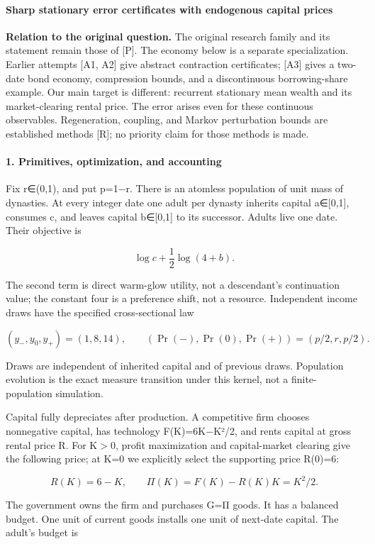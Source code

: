 \documentclass{article}
\begin{document}
\paragraph{Sharp stationary error certificates with endogenous capital prices}

\textbf{Relation to the original question.} The original research family and its statement remain those of [P]. The economy below is a separate specialization. Earlier attempts [A1, A2] give abstract contraction certificates; [A3] gives a two-date bond economy, compression bounds, and a discontinuous borrowing-share example. Our main target is different: recurrent stationary mean wealth and its market-clearing rental price. The error arises even for these continuous observables. Regeneration, coupling, and Markov perturbation bounds are established methods [R]; no priority claim for those methods is made.

\paragraph{1. Primitives, optimization, and accounting}

Fix r∈(0,1), and put p=1−r. There is an atomless population of unit mass of dynasties. At every integer date one adult per dynasty inherits capital a∈[0,1], consumes c, and leaves capital b∈[0,1] to its successor. Adults live one date. Their objective is

\[
\log c+\frac12\log(4+b).
\tag{1}
\]

The second term is direct warm-glow utility, not a descendant's continuation value; the constant four is a preference shift, not a resource. Independent income draws have the specified cross-sectional law

\[
(y_-,y_0,y_+)=(1,8,14),\qquad
(\Pr(-),\Pr(0),\Pr(+))=(p/2,r,p/2).
\tag{2}
\]

Draws are independent of inherited capital and of previous draws. Population evolution is the exact measure transition under this kernel, not a finite-population simulation.

Capital fully depreciates after production. A competitive firm chooses nonnegative capital, has technology F(K)=6K−K²/2, and rents capital at gross rental price R. For K\(\gt\)0, profit maximization and capital-market clearing give the following price; at K=0 we explicitly select the supporting price R(0)=6:

\[
R(K)=6-K,\qquad
\Pi(K)=F(K)-R(K)K=K^2/2.
\tag{3}
\]

The government owns the firm and purchases G=Π goods. It has a balanced budget. One unit of current goods installs one unit of next-date capital. The adult's budget is
\end{document}
